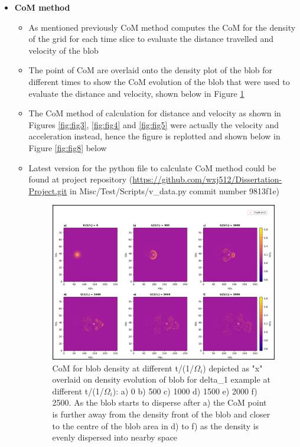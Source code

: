 \documentclass{article}
\begin{document}
\begin{arrowlist}
\begin{itemize}
            \item \textbf{CoM method}
            \begin{itemize}
                \item As mentioned previously CoM method computes the CoM for the density of the grid for each time slice to evaluate the distance travelled and velocity of the blob
                \item The point of CoM are overlaid onto the density plot of the blob for different times to show the CoM evolution of the blob that were used to evaluate the distance and velocity, shown below in Figure \ref{fig:fig7}
                \item The CoM method of calculation for distance and velocity as shown in Figures \ref{fig:fig3}, \ref{fig:fig4} and \ref{fig:fig5} were actually the velocity and acceleration instead, hence the figure is replotted and shown below in Figure \ref{fig:fig8} below
                \item Latest version for the python file to calculate CoM method could be found at project repository (\url{https://github.com/wxj512/Dissertation-Project.git} in Misc/Test/Scripts/v\_data.py commit number 9813f1e)  

    \begin{figure}
        \centering
        \includegraphics[height=0.5\textheight]{./Fig/Fig7 vel n CoM hmap t0_t50}
        \normalsize{\caption{CoM for blob density at different t/(1/$\Omega_i$) depicted as "x" overlaid on density evolution of blob for delta\_1 example at different t/(1/$\Omega_i$): a) 0 b) 500 c) 1000 d) 1500 e) 2000 f) 2500. As the blob starts to disperse after a) the CoM point is further away from the density front of the blob and closer to the centre of the blob area in d) to f) as the density is evenly dispersed into nearby space}
        \label{fig:fig7}}
    \end{figure}   


\end{itemize}
\end{itemize}
\end{arrowlist}
\end{document}
